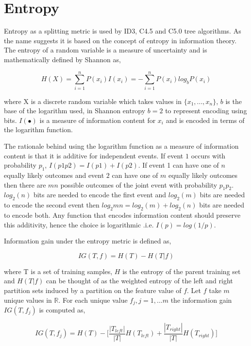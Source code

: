 \documentclass[a4paper,twoside]{report}
\begin{document}
\section{Entropy}

Entropy as a splitting metric is used by  ID3, C4.5 and C5.0 tree algorithms. As the name suggests it is based on the concept of entropy in information theory. The entropy of a random variable is a measure of uncertainty and is mathematically defined by Shannon as, 

\begin{equation}
H(X) = \sum_{i=1}^n P(x_{i})I(x_{i}) = - \sum_{i=1}^n P(x_{i})log_{b}P(x_{i})
\end{equation} 

where X is a discrete random variable which takes values in $\{x_{1},...,x_{n}\}$, $b$ is the base of the logarithm used, in Shannon entropy $b = 2$ to represent encoding using bits. $I(\bullet)$ is a measure of information content for $x_{i}$ and is encoded in terms of the logarithm function.

The rationale behind using the logarithm function as a measure of information content is that it is additive for independent events. If event $1$ occurs with probability $p_{1}$, $I(p1p2) = I(p1) + I(p2)$.
If event 1 can have one of $n$ equally likely outcomes and event $2$ can have one of $m$ equally likely outcomes then there are $mn$ possible outcomes of the joint event with probability $p_{1}p_{2}$.  $log_{2}(n)$ bits are needed to encode the first event and $log_{2}(m)$ bits are needed to encode the second event then $log_2{mn} = log_2(m) + log_2(n)$ bits are needed to encode both. Any function that encodes information content should preserve this additivity, hence the choice is logarithmic .i.e. $I(p) = log(1/p)$.
  
Information gain under the entropy metric is defined as, 

\begin{equation}
IG(T,f) = H(T) - H(T|f)
\end{equation}

where T is a set of training samples, $H$ is the entropy of the parent training set and $H(T|f)$ can be thought of as the weighted entropy of the left and right partition sets induced by a partition on the feature value of $f$. Let $f$ take $m$ unique values in $\mathbb{R}.$ For each unique value $f_{j}, j = 1,...m$ the information gain $IG(T,f_{j})$ is computed as,

\begin{equation}
IG(T,f_{j}) = H(T) - \Bigg[ \dfrac{|T_{left}|}{|T|} H(T_{left}) + \dfrac{|T_{right}|}{|T|} H(T_{right}) \Bigg]
\end{equation} 
\end{document}
